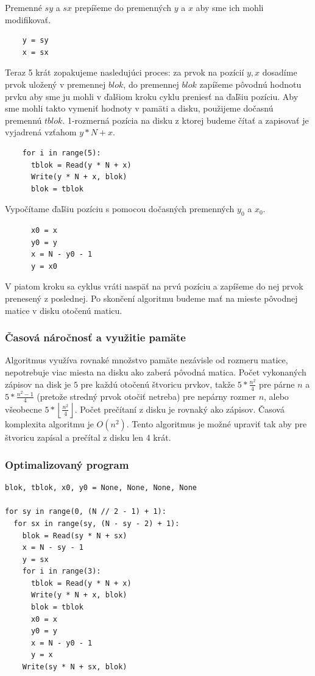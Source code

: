 \documentclass{article}
\begin{document}
Premenné $sy$ a $sx$ prepíšeme do premenných $y$ a $x$ aby sme ich mohli modifikovať.

\begin{verbatim}
    y = sy
    x = sx
\end{verbatim}

Teraz 5 krát zopakujeme nasledujúci proces: za prvok na pozícií $y, x$ dosadíme prvok uložený v premennej $blok$, do premennej $blok$ zapíšeme pôvodnú hodnotu prvku aby sme ju mohli v ďalšiom kroku cyklu preniesť na ďaľšiu pozíciu. Aby sme mohli takto vymeniť hodnoty v pamäti a disku, použijeme dočasnú premennú $tblok$. 1-rozmerná pozícia na disku z ktorej budeme čítať a zapisovať je vyjadrená vzťahom $y * N + x$.

\begin{verbatim}
    for i in range(5):
      tblok = Read(y * N + x)
      Write(y * N + x, blok)
      blok = tblok
\end{verbatim}

Vypočítame ďaľšiu pozíciu s pomocou dočasných premenných $y_0$ a $x_0$.

\begin{verbatim}
      x0 = x
      y0 = y
      x = N - y0 - 1
      y = x0
\end{verbatim}

V piatom kroku sa cyklus vráti naspäť na prvú pozíciu a zapíšeme do nej prvok prenesený z poslednej.
Po skončení algoritmu budeme mať na mieste pôvodnej matice v disku otočenú maticu.

\subsubsection*{Časová náročnosť a využitie pamäte}

Algoritmus využíva rovnaké množstvo pamäte nezávisle od rozmeru matice, nepotrebuje viac miesta na disku ako zaberá pôvodná matica. Počet vykonaných zápisov na disk je $5$ pre každú otočenú štvoricu prvkov, takže $5*\frac{n^2}{4}$ pre párne $n$ a $5*\frac{n^2 - 1}{4}$ (pretože stredný prvok otočiť netreba) pre nepárny rozmer $n$, alebo všeobecne $5*\left\lfloor\frac{n^2}{4}\right\rfloor$. Počet prečítaní z disku je rovnaký ako zápisov. Časová komplexita algoritmu je $O(n^2)$. Tento algoritmus je možné upraviť tak aby pre štvoricu zapísal a prečítal z disku len 4 krát.

\subsubsection*{Optimalizovaný program}

\begin{verbatim}
blok, tblok, x0, y0 = None, None, None, None

for sy in range(0, (N // 2 - 1) + 1):
  for sx in range(sy, (N - sy - 2) + 1):
    blok = Read(sy * N + sx)
    x = N - sy - 1
    y = sx
    for i in range(3):
      tblok = Read(y * N + x)
      Write(y * N + x, blok)
      blok = tblok
      x0 = x
      y0 = y
      x = N - y0 - 1
      y = x
    Write(sy * N + sx, blok)
\end{verbatim}
\end{document}
